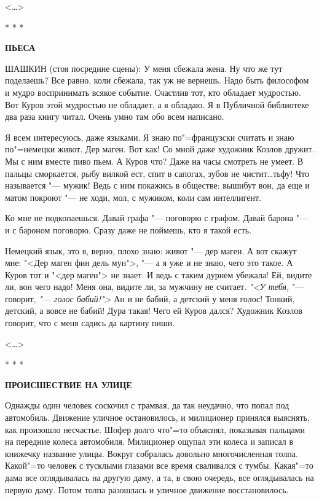 \documentclass{article}
\begin{document}
\begin{flushright}<\dots>\end{flushright}

\begin{center}* * *\end{center}

\begin{center} \textbf{ПЬЕСА}\end{center}

ШАШКИН (стоя посредине сцены): У меня сбежала жена. Ну что же тут поделаешь? Все
равно, коли сбежала, так уж не вернешь. Надо быть философом и мудро воспринимать
всякое событие. Счастлив тот, кто обладает мудростью. Вот Куров этой мудростью
не обладает, а я обладаю. Я в Публичной библиотеке два раза книгу читал. Очень
умно там обо всем написано.

Я всем интересуюсь, даже языками. Я знаю по"=французски считать и знаю
по"=немецки живот. Дер маген. Вот как! Со мной даже художник Козлов дружит. Мы с
ним вместе пиво пьем. А Куров что? Даже на часы смотреть не умеет. В пальцы
сморкается, рыбу вилкой ест, спит в сапогах, зубов не чистит\dots тьфу! Что
называется "--- мужик! Ведь с ним покажись в обществе: вышибут вон, да еще и
матом покроют "--- не ходи, мол, с мужиком, коли сам интеллигент.

Ко мне не подкопаешься. Давай графа "--- поговорю с графом. Давай барона "--- и
с бароном поговорю. Сразу даже не поймешь, кто я такой есть.

Немецкий язык, это я, верно, плохо знаю: живот "--- дер маген. А вот скажут мне:
"<Дер маген фин дель мун">, "--- а я уже и не знаю, чего это такое. А Куров тот
и "<дер маген"> не знает. И ведь с таким дурнем убежала! Ей, видите ли, вон чего
надо! Меня она, видите ли, за мужчину не считает. \textit{"<У тебя,} "---
говорит, \textit{"--- голос бабий!">} Ан и не бабий, а детский у меня голос!
Тонкий, детский, а вовсе не бабий! Дура такая! Чего ей Куров дался? Художник
Козлов говорит, что с меня садись да картину пиши.

\begin{flushright}<\dots>\end{flushright}

\begin{center}* * *\end{center}

\begin{center} \textbf{ПРОИСШЕСТВИЕ НА УЛИЦЕ}\end{center}

Однажды один человек соскочил с трамвая, да так неудачно, что попал под
автомобиль. Движение уличное остановилось, и милиционер принялся выяснять, как
произошло несчастье. Шофер долго что"=то объяснял, показывая пальцами на
передние колеса автомобиля. Милиционер ощупал эти колеса и записал в книжечку
название улицы. Вокруг собралась довольно многочисленная толпа. Какой"=то
человек с тусклыми глазами все время сваливался с тумбы. Какая"=то дама все
оглядывалась на другую даму, а та, в свою очередь, все оглядывалась на первую
даму. Потом толпа разошлась и уличное движение восстановилось.
\end{document}
